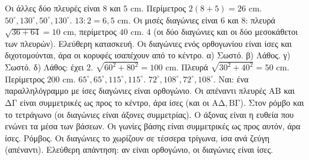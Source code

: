 Οι άλλες δύο πλευρές είναι $8$ και $5$ cm. Περίμετρος $2(8+5)=26$ cm.
 $50^\circ,130^\circ,50^\circ,130^\circ$.
 $13:2=6{,}5$ cm.
 Οι μισές διαγώνιες είναι $6$ και $8$: πλευρά $\sqrt{36+64}=10$ cm, περίμετρος $40$ cm.
 $4$ (οι δύο διαγώνιες και οι δύο μεσοκάθετοι των πλευρών).
 Ελεύθερη κατασκευή. Οι διαγώνιες ενός ορθογωνίου είναι ίσες και διχοτομούνται, άρα οι κορυφές ισαπέχουν από το κέντρο.
 α) Σωστό. β) Λάθος. γ) Σωστό. δ) Λάθος: έχει $2$.
 $\sqrt{60^2+80^2}=100$ cm.
 Πλευρά $\sqrt{30^2+40^2}=50$ cm. Περίμετρος $200$ cm.
 $65^\circ,65^\circ,115^\circ,115^\circ$.
 $72^\circ,108^\circ,72^\circ,108^\circ$.
 Ναι: ένα παραλληλόγραμμο με ίσες διαγώνιες είναι ορθογώνιο.
 Οι απέναντι πλευρές $\mathrm{ΑΒ}$ και $\mathrm{ΔΓ}$ είναι συμμετρικές ως προς το κέντρο, άρα ίσες (και οι $\mathrm{ΑΔ},\mathrm{ΒΓ}$).
 Στον ρόμβο και το τετράγωνο (οι διαγώνιες είναι άξονες συμμετρίας).
 Ο άξονας είναι η ευθεία που ενώνει τα μέσα των βάσεων. Οι γωνίες βάσης είναι συμμετρικές ως προς αυτόν, άρα ίσες.
 Ρόμβος.
 Οι διαγώνιες το χωρίζουν σε τέσσερα τρίγωνα, ίσα ανά ζεύγη (απέναντι).
 Ελεύθερη απάντηση: αν είναι ορθογώνιο, οι διαγώνιες είναι ίσες.
